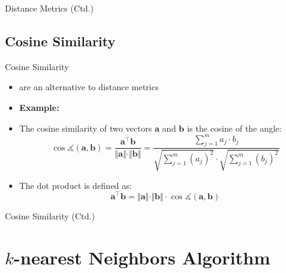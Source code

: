 \begin{frame}{Distance Metrics (Ctd.)}{}
	
\end{frame}


\subsection{Cosine Similarity}

\begin{frame}{Cosine Similarity}{}
	\begin{itemize}
		\item {} are an alternative to distance metrics
		\item \textbf{Example:} 
		\item The cosine similarity of two vectors $\bm{a}$ and $\bm{b}$ is the cosine of the angle:
		\begin{equation}
			\cos \measuredangle (\bm{a}, \bm{b}) = \frac{\bm{a}^{\intercal}\bm{b}}{\Vert \bm{a} \Vert \cdot \Vert \bm{b} \Vert}
				= \frac{\sum_{j=1}^m a_j \cdot b_j}{\sqrt{\sum_{j=1}^m (a_j)^2} \cdot \sqrt{\sum_{j=1}^m (b_j)^2}}
		\end{equation}
		\item The dot product is defined as:
		\begin{equation}
			\bm{a}^{\intercal}\bm{b} = \Vert \bm{a} \Vert \cdot \Vert \bm{b} \Vert \cdot \cos \measuredangle (\bm{a}, \bm{b})
		\end{equation}
	\end{itemize}
\end{frame}


\begin{frame}{Cosine Similarity (Ctd.)}{}
	
\end{frame}


\section{$k$-nearest Neighbors Algorithm}

